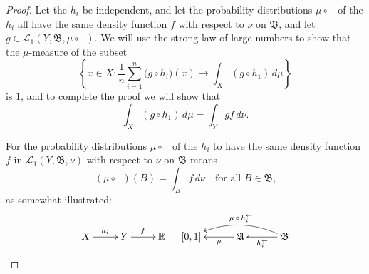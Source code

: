 \documentclass[
twoside=true,
paper=letter,
fontsize=9pt,
pagesize=auto,
leqno,
openany,
headsepline,
overfullrule,
]{scrbook}
\theoremstyle{plain}
\theoremstyle{plain}
\theoremstyle{definition}
\theoremstyle{bfnoteitalic}
\theoremstyle{bfnoteroman}
\newcommand{\sigalg}[1]{\mathfrak{#1}}
\newcommand{\cali}[1]{\mathscr{#1}}
\newcommand{\preimage}[1]{\mathop{#1^{\leftarrow}}}
\newcommand{\R}{\mathbb{R}}
\newcommand{\sigmaalgebra}{\sigalg{A}}
\newcommand{\sigmaalgebraii}{\sigalg{B}}
\newcommand{\funcf}{f}
\newcommand{\funcg}{g}
\newcommand{\funch}{h}
\newcommand{\function}{f}
\newcommand{\measurespace}{X}
\newcommand{\measurespaceii}{Y}
\newcommand{\mspaceelt}{x}
\newcommand{\measure}{\mu}
\newcommand{\measmu}{\mu}
\newcommand{\measnu}{\nu}
\newcommand{\setii}{B}
\begin{document}
\begin{proof}
Let the $\funch_i$ be independent, and let the probability distributions 
$\measure\circ\preimage{\funch_i}$
of the $\funch_i$ all have the same density function $\function$ with respect to 
$\measnu$ on $\sigmaalgebraii$, and let 
$\funcg\in
\cali{L}_1(\measurespaceii,\sigmaalgebraii,\measmu\circ\preimage{\funch_i})$.
We will use the strong law of large numbers to show that the $\measure$-measure of the subset
\[
\left\{ 
\mspaceelt\in\measurespace : 
\frac{1}{n} \sum_{i=1}^n \bigl( \funcg \circ \funch_i \bigr) (x) \to
\int_\measurespace (\funcg \circ \funch_1) \,d\measure 
\right\}
\]
is $1$, and to complete the proof we will show that
\[
\int_\measurespace (\funcg \circ \funch_1) \,d\measure
=
\int_\measurespaceii \funcg \funcf \,d\measnu.
\]


For the probability distributions 
$\measure\circ\preimage{\funch_i}$
of the $\funch_i$ to have the same density function 
$\funcf$ in $\cali{L}_1(\measurespaceii,\sigmaalgebraii,\measnu)$ 
with respect to  $\measnu$ on $\sigmaalgebraii$ means
\[
(\measmu\circ\preimage{\funch_i})(\setii)
=
\int_\setii \funcf\, d\measnu
\quad\text{for all $\setii\in\sigmaalgebraii$,}
\]
as somewhat illustrated:
\[
\xymatrix@R=18pt{
\measurespace \ar[r]^{\funch_i} 
& \measurespaceii \ar[r]^{\funcf} 
& \R \\
}
\quad
\xymatrix@R=18pt@C=30pt{
[0,1]
& \sigmaalgebra 
\ar[l]^-\measmu
& \sigmaalgebraii
\ar[l]^{\preimage{\funch_i}} 
\ar@/_12pt/[ll]_-{\measmu\,\circ\,\preimage{\funch_i}}
}
\]


\end{proof}
\end{document}
